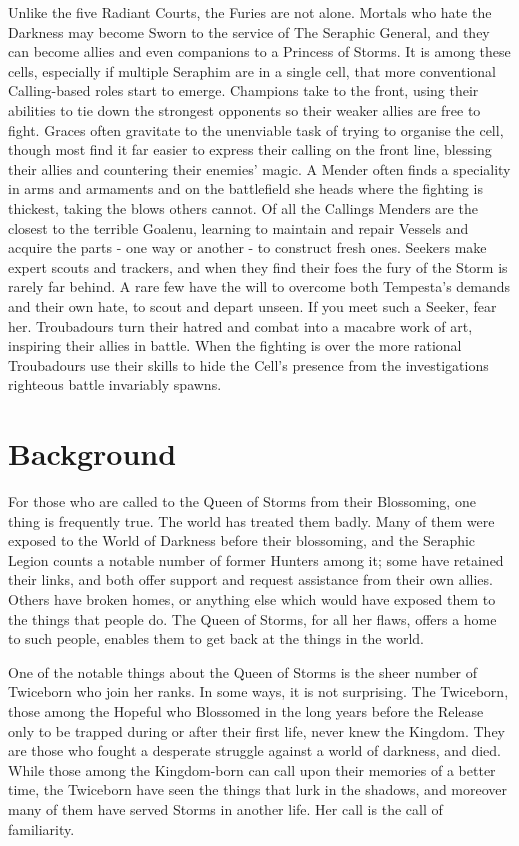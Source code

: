 Unlike the five Radiant Courts, the Furies are not alone. Mortals who hate the Darkness may become Sworn to the service of The Seraphic General, and they can become allies and even companions to a Princess of Storms. It is among these cells, especially if multiple Seraphim are in a single cell, that more conventional Calling-based roles start to emerge. Champions take to the front, using their abilities to tie down the strongest opponents so their weaker allies are free to fight. Graces often gravitate to the unenviable task of trying to organise the cell, though most find it far easier to express their calling on the front line, blessing their allies and countering their enemies' magic. A Mender often finds a speciality in arms and armaments and on the battlefield she heads where the fighting is thickest, taking the blows others cannot. Of all the Callings Menders are the closest to the terrible Goalenu, learning to maintain and repair Vessels and acquire the parts - one way or another - to construct fresh 
ones. Seekers make expert scouts and trackers, and when they find their foes the fury of the Storm is rarely far behind. A rare few have the will to overcome both Tempesta's demands and their own hate, to scout and depart unseen. If you meet such a Seeker, fear her. Troubadours turn their hatred and combat into a macabre work of art, inspiring their allies in battle. When the fighting is over the more rational Troubadours use their skills to hide the Cell's presence from the investigations righteous battle invariably spawns.

\section*{Background}
For those who are called to the Queen of Storms from their Blossoming, one thing is frequently true. The world has treated them badly. Many of them were exposed to the World of Darkness before their blossoming, and the Seraphic Legion counts a notable number of former Hunters among it; some have retained their links, and both offer support and request assistance from their own allies. Others have broken homes, or anything else which would have exposed them to the things that people do. The Queen of Storms, for all her flaws, offers a home to such people, enables them to get back at the things in the world.

One of the notable things about the Queen of Storms is the sheer number of Twiceborn who join her ranks. In some ways, it is not surprising. The Twiceborn, those among the Hopeful who Blossomed in the long years before the Release only to be trapped during or after their first life, never knew the Kingdom. They are those who fought a desperate struggle against a world of darkness, and died. While those among the Kingdom-born can call upon their memories of a better time, the Twiceborn have seen the things that lurk in the shadows, and moreover many of them have served Storms in another life. Her call is the call of familiarity.

